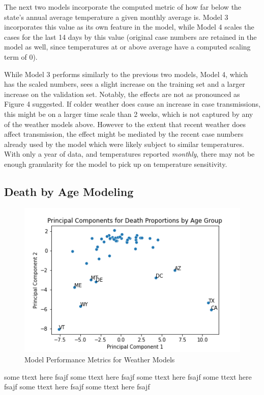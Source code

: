 \documentclass[11pt]{article}
\begin{document}
The next two models incorporate the computed metric of how far below the state's annual average temperature a given monthly average is. Model 3 incorporates this value as its own feature in the model, while Model 4 scales the cases for the last 14 days by this value (original case numbers are retained in the model as well, since temperatures at or above average have a computed scaling term of 0). 

While Model 3 performs similarly to the previous two models, Model 4, which has the scaled numbers, sees a slight increase on the training set and a larger increase on the validation set. Notably, the effects are not as pronounced as Figure 4 suggested. If colder weather does cause an increase in case transmissions, this might be on a larger time scale than 2 weeks, which is not captured by any of the weather models above. However to the extent that recent weather does affect transmission, the effect might be mediated by the recent case numbers already used by the model which were likely subject to similar temperatures. With only a year of data, and temperatures reported \textit{monthly}, there may not be enough granularity for the model to pick up on temperature sensitivity. 





\subsection{Death by Age Modeling}

\begin{figure}
\includegraphics[scale=0.5]{"../figures/initial_death_pca.png"}
\caption{Model Performance Metrics for Weather Models}
\end{figure}
some ttext here fsajf
some ttext here fsajf
some ttext here fsajf
some ttext here fsajf
some ttext here fsajf
some ttext here fsajf









\end{document}

